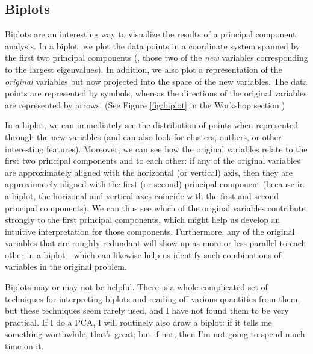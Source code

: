 \subsection{Biplots}

  
Biplots are an interesting way to visualize the results of a principal
component analysis.  In a biplot, we plot the data points in a
coordinate system spanned by the first two principal components (\ie,
those two of the \emph{new} variables corresponding to the largest
eigenvalues). In addition, we also\vadjust{\pagebreak} plot a representation of the
\emph{original} variables but now projected into the space of the new
variables. The data points are represented by symbols, whereas the
directions of the original variables are represented by arrows. (See
Figure \ref{fig:biplot} in the Workshop section.)

In a biplot, we can immediately see the distribution of points when
represented through the new variables (and can also look for clusters,
outliers, or other interesting features). Moreover, we can see how the
original variables relate to the first two principal components and to
each other: if any of the original variables are approximately aligned
with the horizontal (or vertical) axis, then they are approximately
aligned with the first (or second) principal component (because in a
biplot, the horizonal and vertical axes coincide with the first and
second principal components). We can thus see which of the original
variables contribute strongly to the first principal components, which
might help us develop an intuitive interpretation for those
components.  Furthermore, any of the original variables that are
roughly redundant will show up as more or less parallel to each other
in a biplot---which can likewise help us identify such combinations of
variables in the original problem.

Biplots may or may not be helpful. There is a whole complicated set of
techniques for interpreting biplots and reading off various quantities
from them, but these techniques seem rarely used, and I have not found
them to be very practical.  If I do a PCA, I will routinely also draw
a biplot: if it tells me something worthwhile, that's great; but if
not, then I'm not going to spend much time on it.


